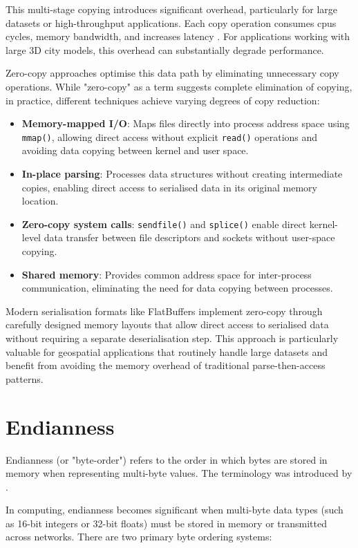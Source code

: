 This multi-stage copying introduces significant overhead, particularly for large datasets or high-throughput applications. Each copy operation consumes \acp{cpu} cycles, memory bandwidth, and increases latency \citep{song2012performance}. For applications working with large 3D city models, this overhead can substantially degrade performance.

Zero-copy approaches optimise this data path by eliminating unnecessary copy operations. While "zero-copy" as a term suggests complete elimination of copying, in practice, different techniques achieve varying degrees of copy reduction:

\begin{itemize}
  \item \textbf{Memory-mapped I/O}: Maps files directly into process address space using \texttt{mmap()}, allowing direct access without explicit \texttt{read()} operations and avoiding data copying between kernel and user space.
  \item \textbf{In-place parsing}: Processes data structures without creating intermediate copies, enabling direct access to serialised data in its original memory location.
  \item \textbf{Zero-copy system calls}: \texttt{sendfile()} and \texttt{splice()} enable direct kernel-level data transfer between file descriptors and sockets without user-space copying.
  \item \textbf{Shared memory}: Provides common address space for inter-process communication, eliminating the need for data copying between processes.
\end{itemize}
Modern serialisation formats like FlatBuffers implement zero-copy through carefully designed memory layouts that allow direct access to serialised data without requiring a separate deserialisation step. This approach is particularly valuable for geospatial applications that routinely handle large datasets and benefit from avoiding the memory overhead of traditional parse-then-access patterns.

\section{Endianness}
\label{tb:endianness}
Endianness (or "byte-order") refers to the order in which bytes are stored in memory when representing multi-byte values. The terminology was introduced by \citet{danny_cohen_1981}.

In computing, endianness becomes significant when multi-byte data types (such as 16-bit integers or 32-bit floats) must be stored in memory or transmitted across networks. There are two primary byte ordering systems:

